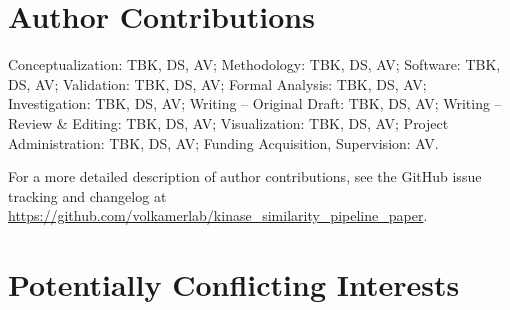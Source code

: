 \documentclass[9pt,training]{livecoms}
\newcommand{\githubrepository}{\url{https://github.com/volkamerlab/kinase_similarity_pipeline_paper}}  %
\begin{document}
\section*{Author Contributions}
%

Conceptualization: TBK, DS, AV; Methodology: TBK, DS, AV; Software: TBK, DS, AV; Validation: TBK, DS, AV; Formal Analysis: TBK, DS, AV; Investigation: TBK, DS, AV; Writing -- Original Draft: TBK, DS, AV; Writing -- Review \& Editing: TBK, DS, AV; Visualization: TBK, DS, AV; Project Administration: TBK, DS, AV; Funding Acquisition, Supervision: AV.

For a more detailed description of author contributions,
see the GitHub issue tracking and changelog at \githubrepository.

%


\section*{Potentially Conflicting Interests}
\end{document}
